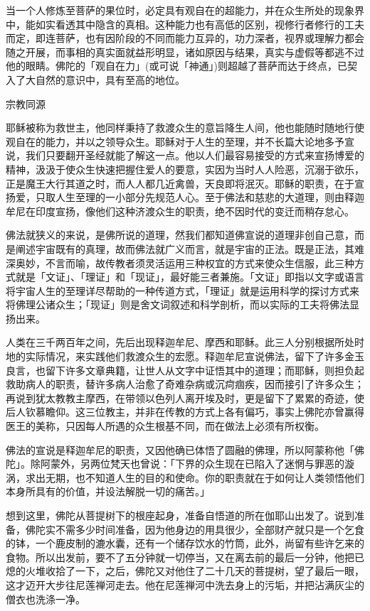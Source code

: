 \documentclass[12pt,twoside,openany]{book}
\begin{document}
当一个人修炼至菩萨的果位时，必定具有观自在的超能力，并在众生所处的现象界中，能如实看透其中隐含的真相。这种能力也有高低的区别，视修行者修行的工夫而定，即连菩萨，也有因阶段的不同而能力互异的，功力深者，视界或理解力都会随之开展，而事相的真实面就益形明显，诸如原因与结果，真实与虚假等都逃不过他的眼睛。佛陀的「观自在力」(或可说「神通」)则超越了菩萨而达于终点，已契入了大自然的意识中，具有至高的地位。

宗教同源

耶稣被称为救世主，他同样秉持了救渡众生的意旨降生人间，他也能随时随地行使观自在的能力，并以之领导众生。耶稣对于人生的至理，并不长篇大论地多予宣说，我们只要翻开圣经就能了解这一点。他以人们最容易接受的方式来宣扬博爱的精神，汲汲于使众生快速把握住爱人的要意，实因为当时人人险恶，沉溺于欲乐，正是魔王大行其道之时，而人人都几近禽兽，天良即将泯灭。耶稣的职责，在于宣扬爱，只取人生至理的一小部分先规范人心。至于佛法和慈悲的大道理，则由释迦牟尼在印度宣扬，像他们这种济渡众生的职责，绝不因时代的变迁而稍存怠心。

佛法就狭义的来说，是佛所说的道理，然我们都知道佛宣说的道理非创自己意，而是阐述宇宙既有的真理，故而佛法就广义而言，就是宇宙的正法。既是正法，其难深奥妙，不言而喻，故传教者须灵活运用三种权宜的方式来使众生信服，此三种方式就是「文证」、「理证」和「现证」，最好能三者兼施。「文证」即指以文字或语言将宇宙人生的至理详尽帮助的一种传道方式，「理证」就是运用科学的探讨方式来将佛理公诸众生；「现证」则是舍文词叙述和科学剖析，而以实际的工夫将佛法显扬出来。

人类在三千两百年之间，先后出现释迦牟尼、摩西和耶稣。此三人分别根据所处时地的实际情况，来实践他们救渡众生的宏愿。释迦牟尼宣说佛法，留下了许多金玉良言，也留下许多文章典籍，让世人从文字中证悟其中的道理；而耶稣，则担负起救助病人的职责，替许多病人治愈了奇难杂病或沉疴痼疾，因而接引了许多众生；再说到犹太教教主摩西，在带领以色列人离开埃及时，更是留下了累累的奇迹，使后人钦慕瞻仰。这三位教主，并非在传教的方式上各有偏巧，事实上佛陀亦曾赢得医王的美称，只因每人所遇的众生根基不同，而在做法上必须有所权衡。

佛法的宣说是释迦牟尼的职责，又因他确已体悟了圆融的佛理，所以阿蒙称他「佛陀」。除阿蒙外，另两位梵天也曾说：「下界的众生现在已陷入了迷惘与罪恶的漩涡，求出无期，也不知道人生的目的和使命。你的职责就在于如何让人类领悟他们本身所具有的价值，并设法解脱一切的痛苦。」

想到这里，佛陀从菩提树下的根座起身，准备自悟道的所在伽耶山出发了。说到准备，佛陀实不需多少时间准备，因为他身边的用具很少，全部财产就只是一个乞食的钵，一个鹿皮制的漉水囊，还有一个储存饮水的竹筒，此外，尚留有些许乞来的食物。所以出发前，要不了五分钟就一切停当，又在离去前的最后一分钟，他把已熄的火堆收拾了一下，之后，佛陀又对他住了二十几天的菩提树，望了最后一眼，这才迈开大步往尼莲禅河走去。他在尼莲禅河中洗去身上的污垢，并把沾满灰尘的僧衣也洗涤一净。
\end{document}
